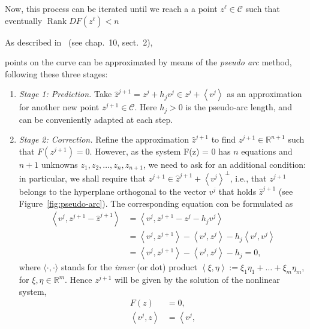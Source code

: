 \documentclass[11pt,reqno,twoside]{article}
\newcommand{\R}{\ensuremath{\mathbb{R}}}
\theoremstyle{remark}
\begin{document}
Now, this process can be iterated until
we reach a a point $z^{\ell}\in\mathcal{C}$ such that 
eventually $\mathop{Rank} DF(z^{\ell}) < n$

As described in~\cite{Kuznetsov2004} (see chap.~10, sect.~2),

points on the curve can be approximated by means of the \emph{pseudo arc}
method, following these three stages:
\begin{enumerate}[label = \emph{\arabic*.}]
  \item \emph{Stage 1: Prediction.} Take $\hat{z}^{j+1} = z^{j} + h_{j}
    v^{j}\in z^{j} + \left\langle v^{j}\right\rangle$ as an approximation
    for another new point $z^{j+1}\in\mathcal{C}$. Here $h_{j} > 0$ is the
    pseudo-arc length, and can be conveniently adapted at each step. \item
    \emph{Stage 2: Correction.} Refine the approximation $\hat{z}^{j+1}$ to
    find $z^{j+1}\in\R^{n+1}$ such that $F\left(z^{j+1}\right) = 0$.
    However, as the system F(z) = 0 has $n$ equations and $n+1$ unknowns
    $z_{1}, z_{2},\dots,z_{n},z_{n+1}$, we need to ask for an additional
    condition: in particular, we shall require that 
    $z^{j+1}\in\hat{z}^{j+1} +\left\langle v^{j}\right\rangle^{\perp}$, i.e., that
    $z^{j+1}$ belongs to
    the hyperplane orthogonal to the vector $v^{j}$ that holds
    $\hat{z}^{j+1}$
    (see Figure~\ref{fig:pseudo-arc}). The  
    corresponding equation con be formulated as
    \begin{align*}
      \left\langle v^{j}, z^{j+1} - \hat{z}^{j+1}\right\rangle &=  
      \left\langle v^{j}, z^{j+1} - z^{j} - h_{j} v^{j}\right\rangle \\
      &= \left\langle v^{j}, z^{j+1}\right\rangle -
        \left\langle v^{j}, z^{j}\right\rangle - 
        h_{j} \left\langle v^{j}, v^{j}\right\rangle\\
      &=  \left\langle v^{j}, z^{j+1}\right\rangle -
          \left\langle v^{j}, z^{j}\right\rangle - h_{j} = 0,
    \end{align*}
    where $\langle\cdot, \cdot\rangle$ stands for the \emph{inner} (or dot)
    product $\left\langle\xi, \eta\right\rangle := \xi_{1}\eta_{1} + \dots +
    \xi_{m}\eta_{m}$, for $\xi, \eta\in\R^{m}$. Hence $z^{j+1}$ will be
    given by the solution of the nonlinear system,
    \begin{displaymath}
      \begin{split}%
        F(z) &= 0,\\
        \left\langle v^{j}, z\right\rangle &= \left\langle v^{j},

\end{split}
\end{displaymath}
\end{enumerate}
\end{document}

